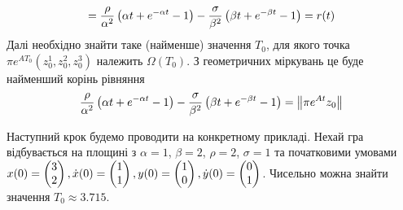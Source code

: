 \begin{example}
\begin{gather*}
        = \frac{\rho}{\alpha^2}\left(\alpha t + e^{-\alpha t} - 1\right) - 
        \frac{\sigma}{\beta^2}\left(\beta t + e^{-\beta t} - 1\right) = r(t)
    \end{gather*}
    Далі необхідно знайти таке (найменше) значення $T_0$, для якого точка $\pi e^{A T_0}(z^1_0, z^2_0, z^3_0)$ належить
    $\Omega(T_0)$. З геометричних міркувань це буде найменший корінь рівняння
    \begin{gather*}
        \frac{\rho}{\alpha^2}\left(\alpha t + e^{-\alpha t} - 1\right) - 
        \frac{\sigma}{\beta^2}\left(\beta t + e^{-\beta t} - 1\right) = \left\Vert \pi e^{A t} z_0 \right\Vert
    \end{gather*}
    
    Наступний крок будемо проводити на конкретному прикладі. Нехай гра відбувається на площині з 
    $\alpha=1$, $\beta=2$, $\rho=2$, $\sigma=1$ та
    початковими умовами $x(0) = \begin{pmatrix}
        3 \\ 2
    \end{pmatrix}, \dot{x}(0) = \begin{pmatrix}
        1 \\ 1
    \end{pmatrix}, y(0) = \begin{pmatrix}
        1 \\ 0
    \end{pmatrix}, \dot{y}(0) = \begin{pmatrix}
        0 \\ 1
    \end{pmatrix}$. Чисельно можна знайти значення $T_0 \approx 3.715$.
    \begin{center}
        
    \end{center}
\end{example}
